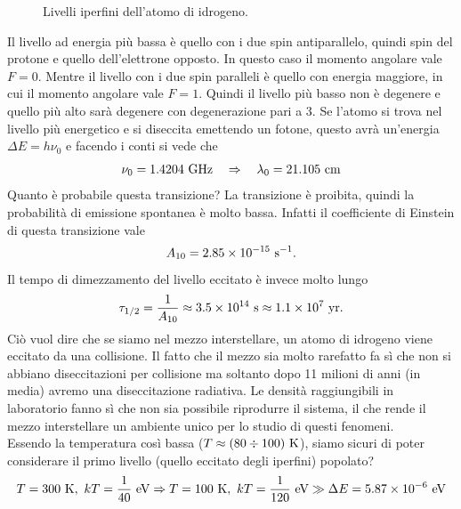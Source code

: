 \begin{figure}
    \centering
    \caption{Livelli iperfini dell'atomo di idrogeno.}
    \label{fig:livelli_iper}
\end{figure}
\noindent
 Il livello ad energia più bassa è quello con i due spin antiparallelo, quindi spin del protone e quello dell'elettrone opposto. In questo caso il momento angolare vale $F=0$. Mentre il livello con i due spin paralleli è quello con energia maggiore, in cui il momento angolare vale $F=1$. Quindi il livello più basso non è degenere e quello più alto sarà degenere con degenerazione pari a 3. Se l'atomo si trova nel livello più energetico e si diseccita emettendo un fotone, questo avrà un'energia $\Delta E = h\nu_0$ e facendo i conti si vede che
\[
    \nu_0 = 1.4204\text{ GHz} \quad \Rightarrow \quad \lambda_0=21.105\text{ cm}
\]
Quanto è probabile questa transizione? La transizione è proibita, quindi la probabilità di emissione spontanea è molto bassa. Infatti il coefficiente di Einstein di questa transizione vale 
\begin{equation}
    A_{10}=2.85\times10^{-15}\text{ s}^{-1}.
    \label{eq:a10}
\end{equation}
Il tempo di dimezzamento del livello eccitato è invece molto lungo 
\begin{equation*}
    \tau_{1/2} = \frac{1}{A_{10}}\approx3.5\times10^{14}\text{ s} \approx 1.1\times 10^7\text{ yr}.
\end{equation*}
Ciò vuol dire che se siamo nel mezzo interstellare, un atomo di idrogeno viene eccitato da una collisione. Il fatto che il mezzo sia molto rarefatto fa sì che non si abbiano diseccitazioni per collisione ma soltanto dopo 11 milioni di anni (in media) avremo una diseccitazione radiativa. Le densità raggiungibili in laboratorio fanno sì che non sia possibile riprodurre il sistema, il che rende il mezzo interstellare un ambiente unico per lo studio di questi fenomeni.\\
Essendo la temperatura così bassa ($T\approx (80\div 100)\text{ K}$), siamo sicuri di poter considerare il primo livello (quello eccitato degli iperfini) popolato?
\[
    T=300\text{ K},\ kT=\frac{1}{40} \text{ eV} \Rightarrow T=100\text{ K},\ kT=\frac{1}{120} \text{ eV} \gg\Delta E = 5.87\times 10^{-6}\text{ eV}
\] 
